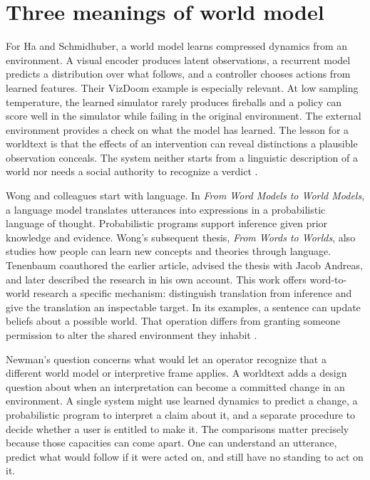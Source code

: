 \documentclass[11pt,letterpaper]{article}
\newcommand{\work}[1]{\textit{#1}}
\begin{document}
\section{Three meanings of world model}

For Ha and Schmidhuber, a world model learns compressed dynamics from an environment. A visual encoder produces latent observations, a recurrent model predicts a distribution over what follows, and a controller chooses actions from learned features. Their VizDoom example is especially relevant. At low sampling temperature, the learned simulator rarely produces fireballs and a policy can score well in the simulator while failing in the original environment. The external environment provides a check on what the model has learned. The lesson for a worldtext is that the effects of an intervention can reveal distinctions a plausible observation conceals. The system neither starts from a linguistic description of a world nor needs a social authority to recognize a verdict \citep{HaSchmidhuber2018}.

Wong and colleagues start with language. In \work{From Word Models to World Models}, a language model translates utterances into expressions in a probabilistic language of thought. Probabilistic programs support inference given prior knowledge and evidence. Wong’s subsequent thesis, \work{From Words to Worlds}, also studies how people can learn new concepts and theories through language. Tenenbaum coauthored the earlier article, advised the thesis with Jacob Andreas, and later described the research in his own account. This work offers word-to-world research a specific mechanism: distinguish translation from inference and give the translation an inspectable target. In its examples, a sentence can update beliefs about a possible world. That operation differs from granting someone permission to alter the shared environment they inhabit \citep{WongEtAl2023,Wong2024,Tenenbaum2026}.

Newman’s question concerns what would let an operator recognize that a different world model or interpretive frame applies. A worldtext adds a design question about when an interpretation can become a committed change in an environment. A single system might use learned dynamics to predict a change, a probabilistic program to interpret a claim about it, and a separate procedure to decide whether a user is entitled to make it. The comparisons matter precisely because those capacities can come apart. One can understand an utterance, predict what would follow if it were acted on, and still have no standing to act on it.
\end{document}
